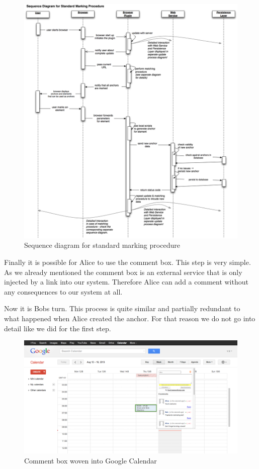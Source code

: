 \begin{figure}\centering
		\includegraphics[width=13cm]{images/sequence-marking-process.png}
		\caption{Sequence diagram for standard marking procedure}
		\label{sequence-marking-process}
\end{figure} 

Finally it is possible for Alice to use the comment box. This step is very simple. As we already mentioned the comment box is an external service that is only injected by a link into our system. Therefore Alice can add a comment without any consequences to our system at all.

Now it is Bobs turn. This process is quite similar and partially redundant to what happened when Alice created the anchor. For that reason we do not go into detail like we did for the first step.

\begin{figure}\centering
	\includegraphics[width=13cm]{images/gcal-combined.png}
\caption{Comment box woven into Google Calendar}
\label{gcal-combined}
\end{figure}

